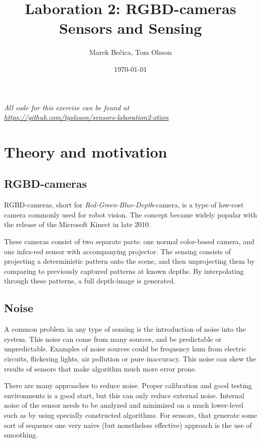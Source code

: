 \documentclass[11pt]{article}
\title{Laboration 2: RGBD-cameras\\ {\small Sensors and Sensing}}
\author{Marek Bečica, Tom Olsson}
\date{\today}
\begin{document}
\maketitle %
\begin{center}
  \emph{All code for this exercise can be found at \\ \url{https://github.com/tgolsson/sensors-laboration2-xtion}}
\end{center}
\lstlistoflistings %
\listoffigures %
\listoftables
\lstset{ matchrangestart=t} %
\section{Theory and motivation}
\subsection{RGBD-cameras}

RGBD-cameras, short for \emph{Red-Green-Blue-Depth}-camera, is a type of low-cost camera commonly used for robot vision. The concept became widely popular with the release of the Microsoft Kinect in late 2010. \par

These cameras consist of two separate parts: one normal color-based camera, and one infra-red sensor with accompanying projector. The sensing consists of projecting a deterministic pattern onto the scene, and then unprojecting them by comparing to previously captured patterns at known depths. By interpolating through these patterns, a full depth-image is generated.  
\subsection{Noise}
A common problem in any type of sensing is the introduction of noise into the system. This noise can come from many sources, and be predictable or unpredictable. Examples of noise sources could be frequency hum from electric circuits, flickering lights, air pollution or pure inaccuracy. This noise can skew the results of sensors that make algorithm much more error prone. \par

There are many approaches to reduce noise. Proper calibration and good testing environments is a good start, but this can only reduce external noise. Internal noise of the sensor needs to be analyzed and minimized on a much lower-level such as by using specially constructed algorithms. For sensors, that generate some sort of sequence one very naive (but nonetheless effective) approach is the use of smoothing. \par
\end{document}
